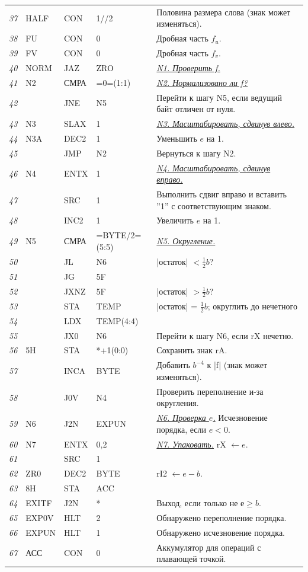{\begin{longtable}{l l l l l}
\textit{37} & HALF & CON & 1//2	& Половина размера слова (знак может изменяться).\\
\textit{38}	& FU & CON & 0 & Дробная часть $f_u$.\\
\textit{39} & FV & CON & 0 & Дробная часть $f_v$.\\
\textit{40}	& NORM & JAZ & ZRO & \underline{\textit{N1. Проверить f.}}\\
\textit{41}	& N2 & СМРА	& =0=(1:1) & \underline{\textit{N2. Нормализовано ли f?}}\\
\textit{42}	& & JNE & N5 & Перейти к шагу N5, если ведущий байт отличен от нуля.\\
\textit{43} & N3 & SLAX & 1 & \underline{\textit{N3. Масштабировать, сдвинув влево.}}\\
\textit{44}	& N3A & DEC2 & 1 & Уменьшить $e$ на 1.\\
\textit{45}	& & JMP & N2 & Вернуться к шагу N2.\\
\textit{46} & N4 & ENTX & 1 & \underline{\textit{N4. Масштабировать, сдвинув вправо.}}\\
\textit{47}	& & SRC & 1 & Выполнить сдвиг вправо и вставить ''1'' с соответствующим знаком.\\
\textit{48}	& & INC2 & 1 & Увеличить $e$ на 1.\\
\textit{49} & N5 & СМРА & =BYTE/2=(5:5) & \underline{\textit{N5. Округление.}}\\
\textit{50}	& & JL & N6 & |остаток| $< \frac{1}{2}b$?\\
\textit{51}	& & JG & 5F &\\	
\textit{52}	& & JXNZ & 5F & |остаток| $> \frac{1}{2}b$?\\
\textit{53}	& & STA & TEMP & |остаток| = $\frac{1}{2}b$; округлить до нечетного\\
\textit{54}	& & LDX & TEMP(4:4) &\\	
\textit{55}	& &	JX0 & N6 & Перейти к шагу N6, если rX нечетно.\\
\textit{56} & 5Н & STA & *+1(0:0) & Сохранить знак rA.\\
\textit{57}	& & INCA & BYTE & Добавить $b^{-4} $ к |f| (знак может изменяться).\\
\textit{58} & & J0V & N4 & Проверить переполнение и-за округления.\\
\textit{59} & N6 & J2N & EXPUN & \underline{\textit{N6. Проверка $e$.}} Исчезновение порядка, если $e < 0$.\\
\textit{60}	& N7 & ENTX & 0,2 & \underline{\textit{N7. Упаковать.}} rX $\leftarrow e$.\\
\textit{61} & & SRC & 1 &\\	
\textit{62}	& ZR0 & DEC2 & BYTE & rI2 $\leftarrow e - b$.\\
\textit{63} & 8Н & STA & ACC &\\
\textit{64} & EXITF & J2N & * & Выход, если только не $е \geq b$.\\
\textit{65} & EXP0V & HLT & 2 & Обнаружено переполнение порядка.\\
\textit{66}	& EXPUN & HLT & 1 & Обнаружено исчезновение порядка.\\
\textit{67}	& АСС & CON	& 0 & Аккумулятор для операций с плавающей точкой.\\


\end{longtable}}
